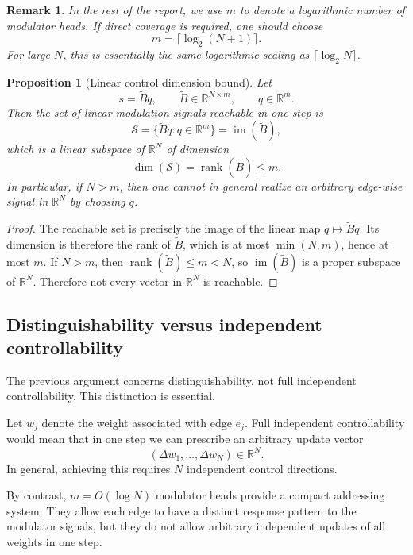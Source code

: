 \documentclass[11pt]{article}
\newtheorem{proposition}{Proposition}
\newtheorem{remark}{Remark}
\newcommand{\R}{\mathbb{R}}
\newcommand{\1}{\mathbf{1}}
\begin{document}
\begin{remark}
In the rest of the report, we use \(m\) to denote a logarithmic number of modulator heads. If direct coverage is required, one should choose
\[
m=\lceil \log_2(N+1)\rceil.
\]
For large \(N\), this is essentially the same logarithmic scaling as \(\lceil \log_2 N\rceil\).
\end{remark}

\begin{proposition}[Linear control dimension bound]
Let
\[
s=\widetilde B q,
\qquad
\widetilde B\in\R^{N\times m},
\qquad
q\in\R^m.
\]
Then the set of linear modulation signals reachable in one step is
\[
\mathcal S
=
\{\widetilde B q:q\in\R^m\}
=
\operatorname{im}(\widetilde B),
\]
which is a linear subspace of \(\R^N\) of dimension
\[
\dim(\mathcal S)=\operatorname{rank}(\widetilde B)\le m.
\]
In particular, if \(N>m\), then one cannot in general realize an arbitrary edge-wise signal in \(\R^N\) by choosing \(q\).
\end{proposition}

\begin{proof}
The reachable set is precisely the image of the linear map \(q\mapsto \widetilde B q\). Its dimension is therefore the rank of \(\widetilde B\), which is at most \(\min(N,m)\), hence at most \(m\). If \(N>m\), then \(\operatorname{rank}(\widetilde B)\le m<N\), so \(\operatorname{im}(\widetilde B)\) is a proper subspace of \(\R^N\). Therefore not every vector in \(\R^N\) is reachable.
\end{proof}

\subsection{Distinguishability versus independent controllability}

The previous argument concerns distinguishability, not full independent controllability. This distinction is essential.

Let \(w_j\) denote the weight associated with edge \(e_j\). Full independent controllability would mean that in one step we can prescribe an arbitrary update vector
\[
(\Delta w_1,\dots,\Delta w_N)\in \R^N.
\]
In general, achieving this requires \(N\) independent control directions.

By contrast, \(m=O(\log N)\) modulator heads provide a compact addressing system. They allow each edge to have a distinct response pattern to the modulator signals, but they do not allow arbitrary independent updates of all weights in one step.
\end{document}

